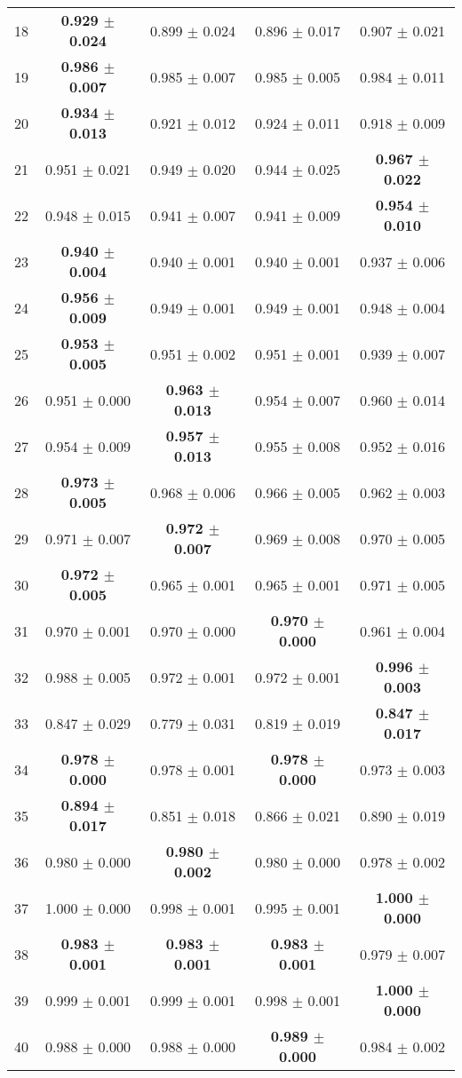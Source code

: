 \begin{table}[!ht]
{\begin{tabular}{r c c c c}
18 & \textbf{0.929 $\pm$ 0.024} & 0.899 $\pm$ 0.024 & 0.896 $\pm$ 0.017 & 0.907 $\pm$ 0.021 \\
19 & \textbf{0.986 $\pm$ 0.007} & 0.985 $\pm$ 0.007 & 0.985 $\pm$ 0.005 & 0.984 $\pm$ 0.011 \\
20 & \textbf{0.934 $\pm$ 0.013} & 0.921 $\pm$ 0.012 & 0.924 $\pm$ 0.011 & 0.918 $\pm$ 0.009 \\
21 & 0.951 $\pm$ 0.021 & 0.949 $\pm$ 0.020 & 0.944 $\pm$ 0.025 & \textbf{0.967 $\pm$ 0.022} \\
22 & 0.948 $\pm$ 0.015 & 0.941 $\pm$ 0.007 & 0.941 $\pm$ 0.009 & \textbf{0.954 $\pm$ 0.010} \\
23 & \textbf{0.940 $\pm$ 0.004} & 0.940 $\pm$ 0.001 & 0.940 $\pm$ 0.001 & 0.937 $\pm$ 0.006 \\
24 & \textbf{0.956 $\pm$ 0.009} & 0.949 $\pm$ 0.001 & 0.949 $\pm$ 0.001 & 0.948 $\pm$ 0.004 \\
25 & \textbf{0.953 $\pm$ 0.005} & 0.951 $\pm$ 0.002 & 0.951 $\pm$ 0.001 & 0.939 $\pm$ 0.007 \\
26 & 0.951 $\pm$ 0.000 & \textbf{0.963 $\pm$ 0.013} & 0.954 $\pm$ 0.007 & 0.960 $\pm$ 0.014 \\
27 & 0.954 $\pm$ 0.009 & \textbf{0.957 $\pm$ 0.013} & 0.955 $\pm$ 0.008 & 0.952 $\pm$ 0.016 \\
28 & \textbf{0.973 $\pm$ 0.005} & 0.968 $\pm$ 0.006 & 0.966 $\pm$ 0.005 & 0.962 $\pm$ 0.003 \\
29 & 0.971 $\pm$ 0.007 & \textbf{0.972 $\pm$ 0.007} & 0.969 $\pm$ 0.008 & 0.970 $\pm$ 0.005 \\
30 & \textbf{0.972 $\pm$ 0.005} & 0.965 $\pm$ 0.001 & 0.965 $\pm$ 0.001 & 0.971 $\pm$ 0.005 \\
31 & 0.970 $\pm$ 0.001 & 0.970 $\pm$ 0.000 & \textbf{0.970 $\pm$ 0.000} & 0.961 $\pm$ 0.004 \\
32 & 0.988 $\pm$ 0.005 & 0.972 $\pm$ 0.001 & 0.972 $\pm$ 0.001 & \textbf{0.996 $\pm$ 0.003} \\
33 & 0.847 $\pm$ 0.029 & 0.779 $\pm$ 0.031 & 0.819 $\pm$ 0.019 & \textbf{0.847 $\pm$ 0.017} \\
34 & \textbf{0.978 $\pm$ 0.000} & 0.978 $\pm$ 0.001 & \textbf{0.978 $\pm$ 0.000} & 0.973 $\pm$ 0.003 \\
35 & \textbf{0.894 $\pm$ 0.017} & 0.851 $\pm$ 0.018 & 0.866 $\pm$ 0.021 & 0.890 $\pm$ 0.019 \\
36 & 0.980 $\pm$ 0.000 & \textbf{0.980 $\pm$ 0.002} & 0.980 $\pm$ 0.000 & 0.978 $\pm$ 0.002 \\
37 & 1.000 $\pm$ 0.000 & 0.998 $\pm$ 0.001 & 0.995 $\pm$ 0.001 & \textbf{1.000 $\pm$ 0.000} \\
38 & \textbf{0.983 $\pm$ 0.001} & \textbf{0.983 $\pm$ 0.001} & \textbf{0.983 $\pm$ 0.001} & 0.979 $\pm$ 0.007 \\
39 & 0.999 $\pm$ 0.001 & 0.999 $\pm$ 0.001 & 0.998 $\pm$ 0.001 & \textbf{1.000 $\pm$ 0.000} \\
40 & 0.988 $\pm$ 0.000 & 0.988 $\pm$ 0.000 & \textbf{0.989 $\pm$ 0.000} & 0.984 $\pm$ 0.002 \\
\end{tabular}}
\end{table}
